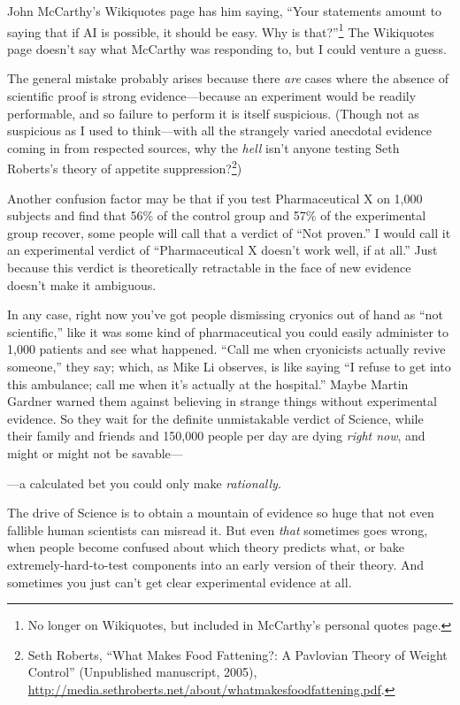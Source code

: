 {
 John McCarthy's Wikiquotes page has him saying,
``Your statements amount to saying that if AI is
possible, it should be easy. Why is
that?''\footnote{No longer on Wikiquotes, but included in
McCarthy's personal quotes page.} The Wikiquotes page
doesn't say what McCarthy was responding to, but I
could venture a guess.}

{
 The general mistake probably arises because there \textit{are}
cases where the absence of scientific proof is strong
evidence---because an experiment would be readily performable, and so
failure to perform it is itself suspicious. (Though not as suspicious
as I used to think---with all the strangely varied anecdotal evidence
coming in from respected sources, why the \textit{hell}
isn't anyone testing Seth Roberts's
theory of appetite suppression?\footnote{Seth Roberts, ``What Makes Food Fattening?: A
Pavlovian Theory of Weight Control'' (Unpublished
manuscript, 2005),
\url{http://media.sethroberts.net/about/whatmakesfoodfattening.pdf}.})}

{
 Another confusion factor may be that if you test Pharmaceutical X
on 1,000 subjects and find that 56\% of the control group and 57\% of
the experimental group recover, some people will call that a verdict of
``Not proven.'' I would call it an
experimental verdict of ``Pharmaceutical X
doesn't work well, if at all.'' Just
because this verdict is theoretically retractable in the face of new
evidence doesn't make it ambiguous.}

{
 In any case, right now you've got people
dismissing cryonics out of hand as ``not
scientific,'' like it was some kind of pharmaceutical
you could easily administer to 1,000 patients and see what happened.
``Call me when cryonicists actually revive
someone,'' they say; which, as Mike Li observes, is
like saying ``I refuse to get into this ambulance;
call me when it's actually at the
hospital.'' Maybe Martin Gardner warned them against
believing in strange things without experimental evidence. So they wait
for the definite unmistakable verdict of Science, while their family
and friends and 150,000 people per day are dying \textit{right now},
and might or might not be savable---}

{
 {}---a calculated bet you could only make \textit{rationally.}}

{
 The drive of Science is to obtain a mountain of evidence so huge
that not even fallible human scientists can misread it. But even
\textit{that} sometimes goes wrong, when people become confused about
which theory predicts what, or bake extremely-hard-to-test components
into an early version of their theory. And sometimes you just
can't get clear experimental evidence at all.}

